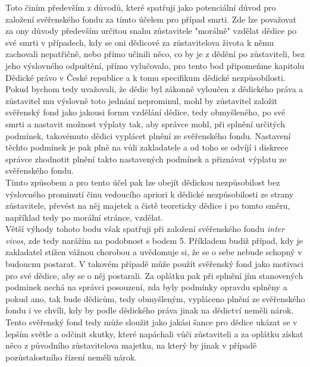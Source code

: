 \documentclass{article}
\begin{document}
Toto činím především z důvodů, které spatřuji jako potenciální důvod pro založení svěřenského fondu za tímto účelem pro případ smrti. Zde lze považovat za ony důvody především určitou snahu zůstavitele "morálně" vzdělat dědice po své smrti v případech, kdy se oni dědicové za zůstavitelova života k němu zachovali nepatřičně, nebo přímo učinili něco, co by je z dědění po zůstaviteli, bez jeho výslovného odpuštění, přímo vylučovalo, pro tento bod připomeňme kapitolu Dědické právo v České republice a k tomu specifikum dědické nezpůsobilosti.\\

Pokud bychom tedy uvažovali, že dědic byl zákonně vyloučen z dědického práva a zůstavitel mu výslovně toto jednání neprominul, mohl by zůstavitel založit svěřenský fond jako jakousi formu vzdělání dědice, tedy obmyšleného, po své smrti a nastavit možnost výplaty tak, aby správce mohl, při splnění určitých podmínek, takovémuto dědici vyplácet plnění ze svěřenského fondu. Nastavení těchto podmínek je pak plně na vůli zakladatele a od toho se odvíjí i diskrece správce zhodnotit plnění takto nastavených podmínek a přiznávat výplatu ze svěřenského fondu.\\

Tímto způsobem a pro tento účel pak lze obejít dědickou nezpůsobilost bez výslovného prominutí činu vedoucího apriori k dědické nezpůsobilosti ze strany zůstavitele, převést na něj majetek a čistě teoreticky dědice i po tomto směru, například tedy po morální stránce, vzdělat.\\

Větší výhody tohoto bodu však spatřuji při založení svěřenského fondu \textit{inter vivos}, zde tedy narážím na podobnost s bodem 5. Příkladem budiž případ, kdy je zakladatel stížen vážnou chorobou a uvědomuje si, že se o sebe nebude schopný v budoucnu postarat. V takovém případě může použít svěřenský fond jako motivaci pro své dědice, aby se o něj postarali. Za oplátku pak při splnění jím stanovených podmínek nechá na správci posouzení, zda byly podmínky opravdu splněny a pokud ano, tak bude dědicům, tedy obmyšleným, vypláceno plnění ze svěřenského fondu i ve chvíli, kdy by podle dědického práva jinak na dědictví neměli nárok. Tento svěřenský fond tedy může sloužit jako jakási šance pro dědice ukázat se v lepším světle a odčinit skutky, které napáchali vůči zůstaviteli a za oplátku získat něco z původního zůstavitelova majetku, na který by jinak v případě pozůstalostního řízení neměli nárok.\\
\end{document}
